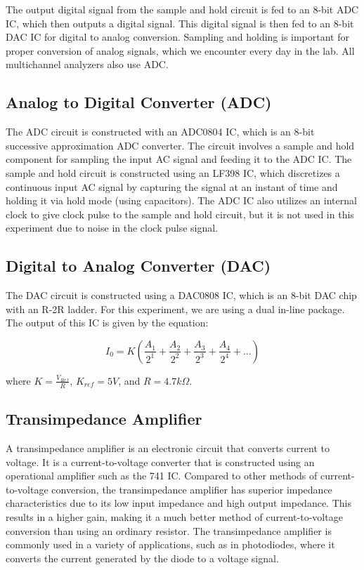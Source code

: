 		The output digital signal from the sample and hold circuit is fed to an 8-bit ADC IC, which then outputs a digital signal. This digital signal is then fed to an 8-bit DAC IC for digital to analog conversion. Sampling and holding is important for proper conversion of analog signals, which we encounter every day in the lab. All multichannel analyzers also use ADC.

	\subsection{Analog to Digital Converter (ADC)}

		The ADC circuit is constructed with an ADC0804 IC, which is an 8-bit successive approximation ADC converter. The circuit involves a sample and hold component for sampling the input AC signal and feeding it to the ADC IC. The sample and hold circuit is constructed using an LF398 IC, which discretizes a continuous input AC signal by capturing the signal at an instant of time and holding it via hold mode (using capacitors). The ADC IC also utilizes an internal clock to give clock pulse to the sample and hold circuit, but it is not used in this experiment due to noise in the clock pulse signal.

	\subsection{Digital to Analog Converter (DAC)}

		The DAC circuit is constructed using a DAC0808 IC, which is an 8-bit DAC chip with an R-2R ladder. For this experiment, we are using a dual in-line package. The output of this IC is given by the equation:
		
		\begin{equation}
			I_0 = K \left(\frac{A_1}{2^1} + \frac{A_2}{2^2} + \frac{A_3}{2^3} + \frac{A_4}{2^4} + \dots \right)
			\label{eq:1}
		\end{equation}

		where $K = \frac{V_{Ref}}{R}$, $K_{ref} = 5V$, and $R = 4.7k\Omega$.
	
	\subsection{Transimpedance Amplifier}

		A transimpedance amplifier is an electronic circuit that converts current to voltage. It is a current-to-voltage converter that is constructed using an operational amplifier such as the 741 IC. Compared to other methods of current-to-voltage conversion, the transimpedance amplifier has superior impedance characteristics due to its low input impedance and high output impedance. This results in a higher gain, making it a much better method of current-to-voltage conversion than using an ordinary resistor. The transimpedance amplifier is commonly used in a variety of applications, such as in photodiodes, where it converts the current generated by the diode to a voltage signal.